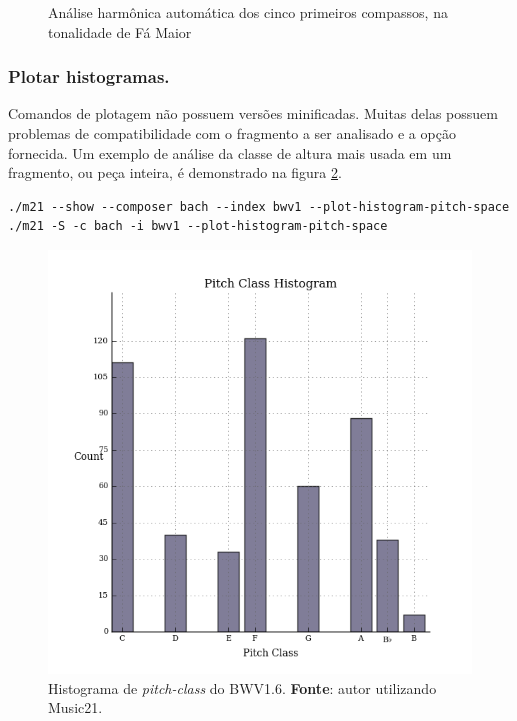 \begin{figure}
  \centering
  
  \caption{Análise harmônica automática dos cinco primeiros compassos, na tonalidade de Fá Maior  }
    \label{fig:bwv_anal}
\end{figure}

\subsubsection*{Plotar histogramas.}

Comandos de plotagem não possuem versões minificadas. Muitas delas possuem problemas de compatibilidade com o fragmento a ser analisado e a opção fornecida. Um exemplo de análise da classe de altura mais usada em um fragmento, ou peça inteira, é demonstrado na figura \ref{fig:pitch-class-bwv1-histogram}.

\begin{verbatim}
./m21 --show --composer bach --index bwv1 --plot-histogram-pitch-space
./m21 -S -c bach -i bwv1 --plot-histogram-pitch-space
\end{verbatim}

\begin{figure}[h]
  \centering
  \includegraphics[scale=0.71]{../analysis/bwv1/pitch-class.png}
  \caption{Histograma de \emph{pitch-class} do BWV1.6. \textbf{Fonte}: autor utilizando Music21.}
    \label{fig:pitch-class-bwv1-histogram}
\end{figure}
